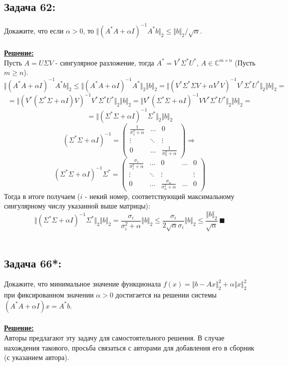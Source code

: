 \documentclass[a4paper,12pt,titlepage,final]{article}
\begin{document}
\subsection*{Задача 62:}
\noindent Докажите, что если $\alpha > 0$, то $\Vert (A^*A + \alpha I)^{-1}A^*b\Vert_2 \leq \Vert b \Vert_2 / \sqrt{\alpha}$.\\ \\
\textbf{\underline{Решение:}} \\
Пусть $A = U\Sigma V$ - сингулярное разложение, тогда $A^* = V^*\Sigma^*U^*$, $A \in \mathbb{C}^{m \times n}$ (Пусть $m \geq n$).
$$\Vert (A^*A + \alpha I)^{-1}A^*b\Vert_2 \leq \Vert (A^*A + \alpha I)^{-1}A^*\Vert_2 \Vert b \Vert_2 = 
\Vert (V^*\Sigma^*\Sigma V + \alpha V^*V)^{-1}V^*\Sigma^*U^* \Vert_2 \Vert b \Vert_2 = $$
$$ = \Vert (V^*(\Sigma^*\Sigma + \alpha I)V)^{-1}V^*\Sigma^*U^* \Vert_2 \Vert b \Vert_2 =
\Vert V^* (\Sigma^*\Sigma + \alpha I)^{-1} VV^* \Sigma^* U^*\Vert_2 \Vert b \Vert_2 = $$
$$ = \Vert (\Sigma^*\Sigma + \alpha I)^{-1}\Sigma^*\Vert_2 \Vert b \Vert_2 $$
$$ (\Sigma^*\Sigma + \alpha I)^{-1} = 
\begin{pmatrix}
    \frac{1}{\sigma_1^2 + \alpha} & \ldots & 0 \\
    \vdots & \ddots & \vdots \\
    0 & \ldots & \frac{1}{\sigma_n^2 + \alpha}
\end{pmatrix} \Rightarrow $$
$$
(\Sigma^*\Sigma + \alpha I)^{-1} \Sigma^* = 
\begin{pmatrix}
    \frac{\sigma_1}{\sigma_1^2 + \alpha} & \ldots & 0 & \ldots & 0\\
    \vdots & \ddots & \vdots & & \vdots \\
    0 & \ldots & \frac{\sigma_n}{\sigma_n^2 + \alpha} & \ldots & 0
\end{pmatrix}
$$
Тогда в итоге получаем ($i$ - некий номер, соответствующий максимальному сингулярному числу указанной выше матрицы):
$$ \Vert (\Sigma^*\Sigma + \alpha I)^{-1}\Sigma^*\Vert_2 \Vert b \Vert_2 = \frac{\sigma_i}{\sigma_i^2 + \alpha}\Vert b \Vert_2 \leq
\frac{\sigma_i}{2\sqrt{\alpha}\sigma_i}\Vert b \Vert_2 \leq \frac{\Vert b \Vert_2}{\sqrt{\alpha}} \, \blacksquare$$ \\

\subsection*{Задача 66*:}
\noindent Докажите, что минимальное значение функционала $f(x) = \Vert b - Ax \Vert_2^2 + \alpha \Vert x\Vert_2^2$
при фиксированном значении $\alpha > 0$ достигается на решении системы $(A^*A + \alpha I)x = A^*b$.\\ \\
\textbf{\underline{Решение:}} \\
Авторы предлагают эту задачу для самостоятельного решения. В случае нахождения такового, просьба связаться с авторами для добавления его в сборник (с указанием автора).
\end{document}
